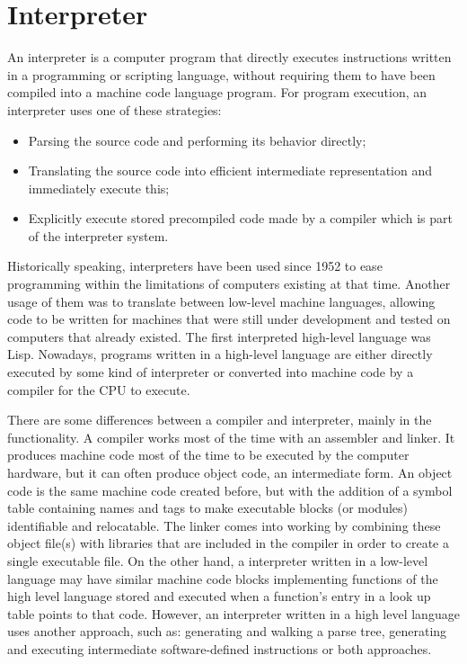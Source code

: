 \documentclass[12pt,a4paper,twoside]{report}
\begin{document}
	
\section{Interpreter}

An interpreter is a computer program that directly executes instructions written in a programming or scripting language, without requiring them to have been compiled into a machine code language program. For program execution, an interpreter uses one of these strategies:

\begin{itemize}
	\item Parsing the source code and performing its behavior directly;
	\item Translating the source code into efficient intermediate representation and immediately execute this;
	\item Explicitly execute stored precompiled code made by a compiler which is part of the interpreter system.
\end{itemize}

Historically speaking, interpreters have been used since 1952 to ease programming within the limitations of computers existing at that time. Another usage of them was to translate between low-level machine languages, allowing code to be written for machines that were still under development and tested on computers that already existed. The first interpreted high-level language was Lisp. Nowadays, programs written in a high-level language are either directly executed by some kind of interpreter or converted into machine code by a compiler for the CPU to execute.

There are some differences between a compiler and interpreter, mainly in the functionality. A compiler works most of the time with an assembler and linker. It produces machine code most of the time to be executed by the computer hardware, but it can often produce object code, an intermediate form. An object code is the same machine code created before, but with the addition of a symbol table containing names and tags to make executable blocks (or modules) identifiable and relocatable. The linker comes into working by combining these object file(s) with libraries that are included in the compiler in order to create a single executable file. On the other hand, a interpreter written in a low-level language may have similar machine code blocks implementing functions of the high level language stored and executed when a function's entry in a look up table points to that code. However, an interpreter written in a high level language uses another approach, such as: generating and walking a parse tree, generating and executing intermediate software-defined instructions or both approaches.
\end{document}
